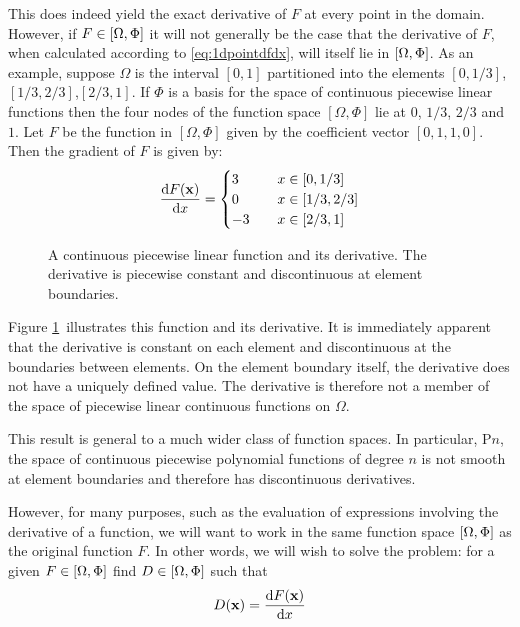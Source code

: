 \documentclass[a4paper, 11pt]{book}
\newcommand{\ifhtlatex}[2]{\ifthenelse{\boolean{HTLatex}}{#1}{#2}}
\newcommand{\xfig}[1]{
  \ifhtlatex{
    \texttt{[image: \#1.png]}
  }{
    
  }
}
\begin{document}
This does indeed yield the exact derivative of $F$ at every point in the
domain. However, if $F\in[\Omega,\Phi]$ it will not generally be the case
that the derivative of $F$, when calculated according to
\eqref{eq:1dpointdfdx}, will itself lie in $[\Omega,\Phi]$. As an example,
suppose $\Omega$ is the interval $[0,1]$ partitioned into the elements
$[0,1/3]$,$[1/3, 2/3]$,$[2/3, 1]$. If $\Phi$ is a basis for the space of
continuous piecewise linear functions then the four nodes of the function
space $[\Omega, \Phi]$ lie at $0$, $1/3$, $2/3$ and $1$. Let $F$ be the
function in $[\Omega, \Phi]$ given by the coefficient vector $[0, 1, 1,
0]$. Then the gradient of $F$ is given by:
\begin{equation}
  \frac{\mathrm{d} F(\mathbf{x})}{\mathrm{d} x}=
  \begin{cases}
    3\quad &x\in[0,1/3]\\
    0\quad &x\in[1/3,2/3]\\
    -3\quad &x\in[2/3,1]\\
  \end{cases}
\end{equation}
\begin{figure}[t]
  \centering
  \xfig{linear_1d_derivative}
  \caption{A continuous piecewise linear function and its derivative. The
    derivative is piecewise constant and discontinuous at element boundaries.}
  \label{fig:1dpointdfdx}
\end{figure}
Figure \ref{fig:1dpointdfdx}\ illustrates this function and its derivative.
It is immediately apparent that the derivative is constant on each element
and discontinuous at the boundaries between elements. On the element
boundary itself, the derivative does not have a uniquely defined value. The
derivative is therefore not a member of the space of piecewise linear
continuous functions on $\Omega$. 

This result is general to a much wider class of function spaces. In
particular, P$n$, the space of continuous piecewise polynomial functions of
degree $n$ is not smooth at element boundaries and therefore has
discontinuous derivatives.

However, for many purposes, such
as the evaluation of expressions involving the derivative of a function, we
will want to work in the same function space $[\Omega,\Phi]$ as the original
function $F$. In other words, we will wish to solve the problem: for a given
$F\in[\Omega,\Phi]$ find $D\in[\Omega,\Phi]$ such that
\begin{equation}
  \label{eq:1d_derivative}
  D(\mathbf{x})=\frac{\mathrm{d} F(\mathbf{x})}{\mathrm{d} x}
\end{equation}
\end{document}
